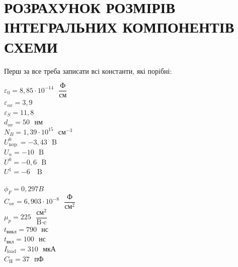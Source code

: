 \documentclass[a4paper,14pt]{extreport}
\begin{document}
\newpage
\chapter{РОЗРАХУНОК РОЗМІРІВ ІНТЕГРАЛЬНИХ КОМПОНЕНТІВ СХЕМИ }

  Перш за все треба записати всі константи, які порібні:\\
  \vspace{0.2cm}
  \begin{minipage}{0.5\textwidth}
  \begin{flushleft}
  \vspace{0.2cm}
  $\varepsilon_{0}=8,85 \cdot 10^{-14} \text{ }\dfrac{\text{Ф}}{\text{см}}$\\
  \vspace{0.2cm}
  $\varepsilon_{ox}=3,9$\\
  \vspace{0.2cm}
  $\varepsilon_{S}=11,8$\\
  \vspace{0.2cm}
  $ d_{o x}=50 \text{ } \text{нм}$\\
  \vspace{0.2cm}
  $ N_{B}=1,39 \cdot 10^{15}\text{ } \text{см}^{-3}$\\
  \vspace{0.2cm}
  $ U_{\text{nop.}}^{0}=-3,43 \text{ }\text{B}$\\
  \vspace{0.2cm}
  $ U_{n}=-10 \text{ }\text{B}$\\
  \vspace{0.2cm}
  $U^{0}=-0,6 \text{ }\text{B}$\\
  \vspace{0.2cm}
  $U^{1}=-6 \text{ }\text{~B}$\\
  \end{flushleft}
  \end{minipage}
  \begin{minipage}{0.3\textwidth}
  \begin{flushright}
  $\phi_{F}=0,297 B$\\
  \vspace{0.2cm}
  $C_{ox}=6,903 \cdot 10^{-8} \text{ }\dfrac{\text{Ф}}{\text{см}^{2}}$\\
  \vspace{0.2cm}
  $\mu_{p} = 225 \text{ }\dfrac{\text{см}^{2}}{\text{B}\cdot\text{c}}$\\
  \vspace{0.2cm}
  $t_{\text{викл}} = 790 \text{ }\text{нс}$\\
  \vspace{0.2cm}
  $ t_{\text{вкл}}= 100 \text{ }\text{нс}$\\
  \vspace{0.2cm} 
  $ I_{\text {load }}= 310\text{ } \text{мкА}$\\
  \vspace{0.2cm}
  $ C_{\text {H}}= 37\text{ } \text{пФ}$\\
  \vspace{0.2cm}
  \end{flushright}
  \end{minipage}
\end{document}
